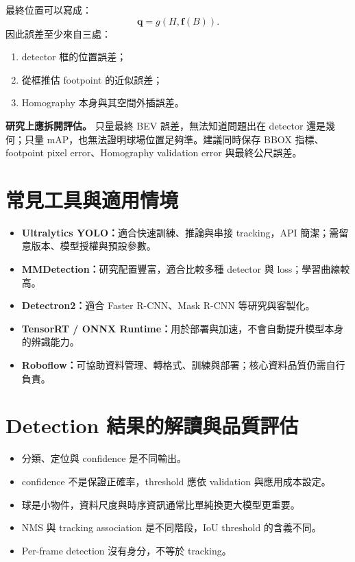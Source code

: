 \documentclass[11pt,a4paper,oneside]{report}
\begin{document}
最終位置可以寫成：
\[
\mathbf q=g(H,\mathbf f(B)).
\]
因此誤差至少來自三處：

\begin{enumerate}
  \item detector 框的位置誤差；
  \item 從框推估 footpoint 的近似誤差；
  \item Homography 本身與其空間外插誤差。
\end{enumerate}

\begin{plainBox}
\textbf{研究上應拆開評估。}\quad
只量最終 BEV 誤差，無法知道問題出在 detector 還是幾何；只量 mAP，也無法證明球場位置足夠準。建議同時保存 BBOX 指標、footpoint pixel error、Homography validation error 與最終公尺誤差。
\end{plainBox}

\section{常見工具與適用情境}

\begin{toolBox}
\begin{itemize}
  \item \textbf{Ultralytics YOLO：}適合快速訓練、推論與串接 tracking，API 簡潔；需留意版本、模型授權與預設參數。
  \item \textbf{MMDetection：}研究配置豐富，適合比較多種 detector 與 loss；學習曲線較高。
  \item \textbf{Detectron2：}適合 Faster R-CNN、Mask R-CNN 等研究與客製化。
  \item \textbf{TensorRT / ONNX Runtime：}用於部署與加速，不會自動提升模型本身的辨識能力。
  \item \textbf{Roboflow：}可協助資料管理、轉格式、訓練與部署；核心資料品質仍需自行負責。
\end{itemize}
\end{toolBox}

\section{Detection 結果的解讀與品質評估}

\begin{takeawayBox}
\begin{itemize}
  \item 分類、定位與 confidence 是不同輸出。
  \item confidence 不是保證正確率，threshold 應依 validation 與應用成本設定。
  \item 球是小物件，資料尺度與時序資訊通常比單純換更大模型更重要。
  \item NMS 與 tracking association 是不同階段，IoU threshold 的含義不同。
  \item Per-frame detection 沒有身分，不等於 tracking。
\end{itemize}
\end{takeawayBox}
\end{document}
